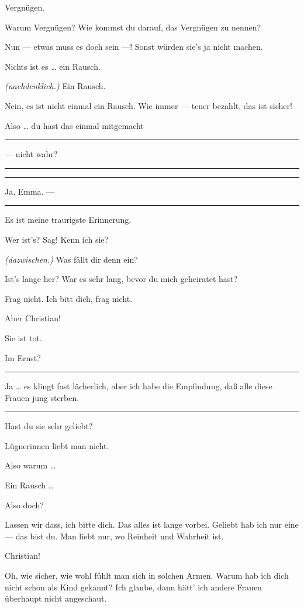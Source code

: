 \documentclass[
	final,
	a4paper,
	ngerman,
	mpinclude = true, %
	twoside = true,
	open = right,
	cleardoublepage = plain,
	DIV = 13,
	BCOR = 1cm,
	titlepage = firstiscover,
	]{scrbook}
\newcommand{\direction}[1]{\textit{(#1)}}
\newenvironment{deletion}{%
		\vspace{0.25\baselineskip}
		\hrule
		\vspace{0.25\baselineskip}
		\color{darkgray}
	}{
		\color{black}
		\vspace{0.25\baselineskip}
		\hrule 
		\vspace{0.25\baselineskip}
	}
\newcommand{\thecharacter}[1]{\textup{\textsc{#1}}\xspace}
\newcommand{\thefrau}{\thecharacter{Emma}}
\newcommand{\thegatte}{\thecharacter{Christian}}
\newcommand{\character}[1]{\item[#1:]}
\newcommand{\frau}{\character{\thefrau}}
\newcommand{\gatte}{\character{\thegatte}}
\begin{document}
\begin{play}
	\frau
	Vergnügen.

	\gatte
	Warum Vergnügen? Wie kommst du darauf, das Vergnügen zu nennen?

	\frau
	Nun --- etwas muss es doch sein ---! Sonst würden sie's ja nicht machen.

	\gatte
	Nichts ist es \ldots{} ein Rausch.

	\frau
	\direction{nachdenklich.} Ein Rausch.

	\gatte
	Nein, es ist nicht einmal ein Rausch. Wie immer --- teuer bezahlt, das ist sicher!

	\frau
	Also \ldots{} du hast das einmal mitgemacht
	\begin{deletion}
		--- nicht wahr?
	\end{deletion}

	\gatte
	\begin{deletion}
		Ja, Emma. ---
	\end{deletion}
	Es ist meine traurigste Erinnerung.

	\frau
	Wer ist's? Sag! Kenn ich sie?

	\gatte
	\direction{dazwischen.} Was fällt dir denn ein?

	\frau
	Ist's lange her? War es sehr lang, bevor du mich geheiratet hast?

	\gatte
	Frag nicht. Ich bitt dich, frag nicht.

	\frau
	Aber Christian!

	\gatte
	Sie ist tot.

	\frau
	Im Ernst?
	\begin{deletion}

	\gatte
	Ja \ldots{} es klingt fast lächerlich, aber ich habe die Empfindung, daß alle diese Frauen jung sterben.

	\frau
	\end{deletion}
	Hast du sie sehr geliebt?

	\gatte
	Lügnerinnen liebt man nicht.

	\frau
	Also warum \ldots{}

	\gatte
	Ein Rausch \ldots{}

	\frau
	Also doch?

	\gatte
	Lassen wir dass, ich bitte dich. Das alles ist lange vorbei. Geliebt hab ich nur eine --- das bist du. Man liebt nur, wo Reinheit und Wahrheit ist.

	\frau
	Christian!

	\gatte
	Oh, wie sicher, wie wohl fühlt man sich in solchen Armen. Warum hab ich dich nicht schon als Kind gekannt? Ich glaube, dann hätt' ich andere Frauen überhaupt nicht angeschaut.


\end{play}
\end{document}
